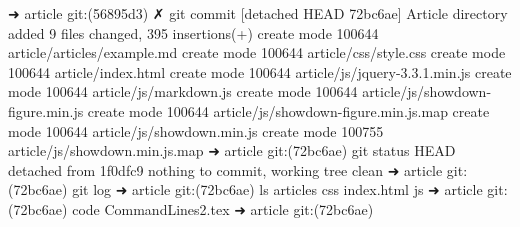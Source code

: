 ➜  article git:(56895d3) ✗ git commit
[detached HEAD 72bc6ae] Article directory added
 9 files changed, 395 insertions(+)
 create mode 100644 article/articles/example.md
 create mode 100644 article/css/style.css
 create mode 100644 article/index.html
 create mode 100644 article/js/jquery-3.3.1.min.js
 create mode 100644 article/js/markdown.js
 create mode 100644 article/js/showdown-figure.min.js
 create mode 100644 article/js/showdown-figure.min.js.map
 create mode 100644 article/js/showdown.min.js
 create mode 100755 article/js/showdown.min.js.map
➜  article git:(72bc6ae) git status
HEAD detached from 1f0dfc9
nothing to commit, working tree clean
➜  article git:(72bc6ae) git log
➜  article git:(72bc6ae) ls
articles   css        index.html js
➜  article git:(72bc6ae) code CommandLines2.tex
➜  article git:(72bc6ae) 
